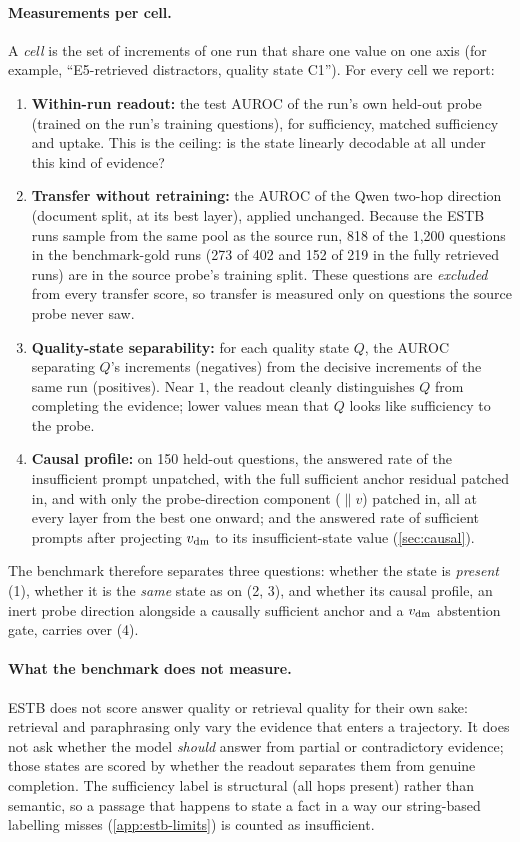 \paragraph{Measurements per cell.} A \emph{cell} is the set of increments of one run that share one value on one axis (for example, ``E5-retrieved distractors, quality state C1''). For every cell we report:
\begin{enumerate}
  \item \textbf{Within-run readout:} the test AUROC of the run's own held-out probe (trained on the run's training questions), for sufficiency, matched sufficiency and uptake. This is the ceiling: is the state linearly decodable at all under this kind of evidence?
  \item \textbf{Transfer without retraining:} the AUROC of the Qwen \musique{} two-hop direction (document split, at its best layer), applied unchanged. Because the ESTB runs sample from the same \musique{} pool as the source run, 818 of the 1{,}200 questions in the benchmark-gold runs (273 of 402 and 152 of 219 in the fully retrieved runs) are in the source probe's training split. These questions are \emph{excluded} from every transfer score, so transfer is measured only on questions the source probe never saw.
  \item \textbf{Quality-state separability:} for each quality state $Q$, the AUROC separating $Q$'s increments (negatives) from the decisive increments of the same run (positives). Near $1$, the readout cleanly distinguishes $Q$ from completing the evidence; lower values mean that $Q$ looks like sufficiency to the probe.
  \item \textbf{Causal profile:} on 150 held-out questions, the answered rate of the insufficient prompt unpatched, with the full sufficient anchor residual patched in, and with only the probe-direction component ($\parallel v$) patched in, all at every layer from the best one onward; and the answered rate of sufficient prompts after projecting $v_{\mathrm{dm}}$ to its insufficient-state value (\cref{sec:causal}).
\end{enumerate}
The benchmark therefore separates three questions: whether the state is \emph{present} (1), whether it is the \emph{same} state as on \musique{} (2, 3), and whether its causal profile, an inert probe direction alongside a causally sufficient anchor and a $v_{\mathrm{dm}}$ abstention gate, carries over (4).

\paragraph{What the benchmark does not measure.} ESTB does not score answer quality or retrieval quality for their own sake: retrieval and paraphrasing only vary the evidence that enters a trajectory. It does not ask whether the model \emph{should} answer from partial or contradictory evidence; those states are scored by whether the readout separates them from genuine completion. The sufficiency label is structural (all hops present) rather than semantic, so a passage that happens to state a fact in a way our string-based labelling misses (\cref{app:estb-limits}) is counted as insufficient.

